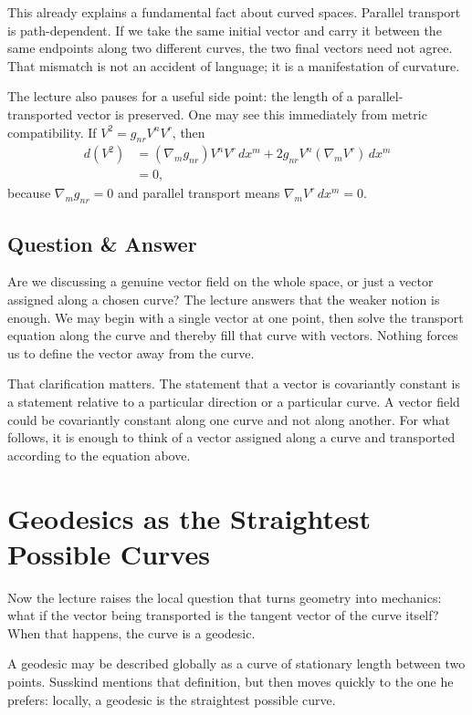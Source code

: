 This already explains a fundamental fact about curved spaces. Parallel transport is path-dependent. If we take the same initial vector and carry it between the same endpoints along two different curves, the two final vectors need not agree. That mismatch is not an accident of language; it is a manifestation of curvature.

The lecture also pauses for a useful side point: the length of a parallel-transported vector is preserved. One may see this immediately from metric compatibility. If \(V^2=g_{nr}V^nV^r\), then
\begin{align}
d(V^2)
&=
(\nabla_m g_{nr})V^nV^r\,dx^m
+
2g_{nr}V^n(\nabla_m V^r)\,dx^m \\
&=0,
\end{align}
because \(\nabla_m g_{nr}=0\) and parallel transport means \(\nabla_m V^r\,dx^m=0\).

\subsection{Question \& Answer}

Are we discussing a genuine vector field on the whole space, or just a vector assigned along a chosen curve? The lecture answers that the weaker notion is enough. We may begin with a single vector at one point, then solve the transport equation along the curve and thereby fill that curve with vectors. Nothing forces us to define the vector away from the curve.

That clarification matters. The statement that a vector is covariantly constant is a statement relative to a particular direction or a particular curve. A vector field could be covariantly constant along one curve and not along another. For what follows, it is enough to think of a vector assigned along a curve and transported according to the equation above.

\section{Geodesics as the Straightest Possible Curves}

Now the lecture raises the local question that turns geometry into mechanics: what if the vector being transported is the tangent vector of the curve itself? When that happens, the curve is a geodesic.

A geodesic may be described globally as a curve of stationary length between two points. Susskind mentions that definition, but then moves quickly to the one he prefers: locally, a geodesic is the straightest possible curve.

